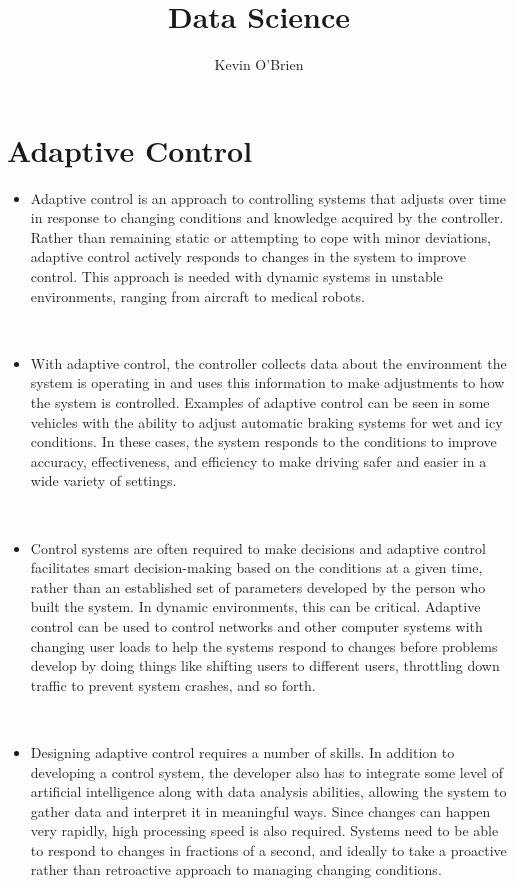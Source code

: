 \documentclass[12pt]{article}
\title{Data Science}
\author{Kevin O'Brien}
\begin{document}
	\section*{Adaptive Control}
	
	\begin{itemize}
		

\item Adaptive control is an approach to controlling systems that adjusts over time in response to changing conditions and knowledge acquired by the controller. Rather than remaining static or attempting to cope with minor deviations, adaptive control actively responds to changes in the system to improve control. This approach is needed with dynamic systems in unstable environments, ranging from aircraft to medical robots.

 

\item With adaptive control, the controller collects data about the environment the system is operating in and uses this information to make adjustments to how the system is controlled. Examples of adaptive control can be seen in some vehicles with the ability to adjust automatic braking systems for wet and icy conditions. In these cases, the system responds to the conditions to improve accuracy, effectiveness, and efficiency to make driving safer and easier in a wide variety of settings.

 

\item Control systems are often required to make decisions and adaptive control facilitates smart decision-making based on the conditions at a given time, rather than an established set of parameters developed by the person who built the system. In dynamic environments, this can be critical. Adaptive control can be used to control networks and other computer systems with changing user loads to help the systems respond to changes before problems develop by doing things like shifting users to different users, throttling down traffic to prevent system crashes, and so forth.

 
\item 
Designing adaptive control requires a number of skills. In addition to developing a control system, the developer also has to integrate some level of artificial intelligence along with data analysis abilities, allowing the system to gather data and interpret it in meaningful ways. Since changes can happen very rapidly, high processing speed is also required. Systems need to be able to respond to changes in fractions of a second, and ideally to take a proactive rather than retroactive approach to managing changing conditions.


\end{itemize}
\end{document}
